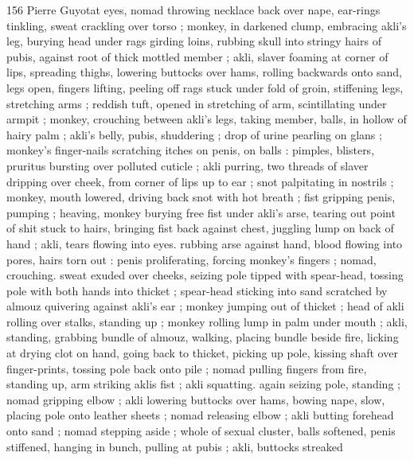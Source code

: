 156 Pierre Guyotat
eyes, nomad throwing necklace back over nape, ear-rings tinkling,
sweat crackling over torso ; monkey, in darkened clump, embracing
akli's leg, burying head under rags girding loins, rubbing skull into
stringy hairs of pubis, against root of thick mottled member ; akli,
slaver foaming at corner of lips, spreading thighs, lowering buttocks
over hams, rolling backwards onto sand, legs open, fingers lifting,
peeling off rags stuck under fold of groin, stiffening legs, stretching
arms ; reddish tuft, opened in stretching of arm, scintillating under
armpit ; monkey, crouching between akli’s legs, taking member, balls,
in hollow of hairy palm ; akli’s belly, pubis, shuddering ; drop of
urine pearling on glans ; monkey's finger-nails scratching itches on
penis, on balls : pimples, blisters, pruritus bursting over polluted
cuticle ; akli purring, two threads of slaver dripping over cheek, from
corner of lips up to ear ; snot palpitating in nostrils ; monkey, mouth
lowered, driving back snot with hot breath ; fist gripping penis,
pumping ; heaving, monkey burying free fist under akli’s arse,
tearing out point of shit stuck to hairs, bringing fist back against
chest, juggling lump on back of hand ; akli, tears flowing into eyes.
rubbing arse against hand, blood flowing into pores, hairs torn out :
penis proliferating, forcing monkey's fingers ; nomad, crouching.
sweat exuded over cheeks, seizing pole tipped with spear-head,
tossing pole with both hands into thicket ; spear-head sticking into
sand scratched by almouz quivering against akli's ear ; monkey
jumping out of thicket ; head of akli rolling over stalks, standing up
; monkey rolling lump in palm under mouth ; akli, standing, grabbing
bundle of almouz, walking, placing bundle beside fire, licking at
drying clot on hand, going back to thicket, picking up pole, kissing
shaft over finger-prints, tossing pole back onto pile ; nomad pulling
fingers from fire, standing up, arm striking aklis fist ; akli squatting.
again seizing pole, standing ; nomad gripping elbow ; akli lowering
buttocks over hams, bowing nape, slow, placing pole onto leather
sheets ; nomad releasing elbow ; akli butting forehead onto sand ;
nomad stepping aside ; whole of sexual cluster, balls softened, penis
stiffened, hanging in bunch, pulling at pubis ; akli, buttocks streaked

